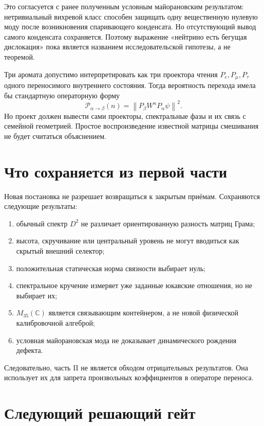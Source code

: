 Это согласуется с ранее полученным условным майорановским результатом:
нетривиальный вихревой класс способен защищать одну вещественную нулевую
моду после возникновения спаривающего конденсата. Но отсутствующий вывод
самого конденсата сохраняется. Поэтому выражение «нейтрино есть бегущая
дислокация» пока является названием исследовательской гипотезы, а не
теоремой.

Три аромата допустимо интерпретировать как три проектора чтения
$P_e,P_\mu,P_\tau$ одного переносимого внутреннего состояния. Тогда
вероятность перехода имела бы стандартную операторную форму
\begin{equation}
 \mathcal P_{\alpha\to\beta}(n)
 =\left\|P_\beta W^nP_\alpha\psi\right\|^2.
 \label{eq:v5-flavour-transfer}
\end{equation}
Но проект должен вывести сами проекторы, спектральные фазы и их связь с
семейной геометрией. Простое воспроизведение известной матрицы смешивания
не будет считаться объяснением.

\section{Что сохраняется из первой части}

Новая постановка не разрешает возвращаться к закрытым приёмам. Сохраняются
следующие результаты:
\begin{enumerate}
 \item обычный спектр $D^2$ не различает ориентированную разность матриц
 Грама;
 \item высота, скручивание или центральный уровень не могут вводиться как
 скрытый внешний селектор;
 \item положительная статическая норма связности выбирает нуль;
 \item спектральное кручение измеряет уже заданные юкавские отношения, но
 не выбирает их;
 \item $M_{35}(\mathbb C)$ является связывающим контейнером, а не новой
 физической калибровочной алгеброй;
 \item условная майорановская мода не доказывает динамического рождения
 дефекта.
\end{enumerate}
Следовательно, часть II не является обходом отрицательных результатов. Она
использует их для запрета произвольных коэффициентов в операторе переноса.

\section{Следующий решающий гейт}

